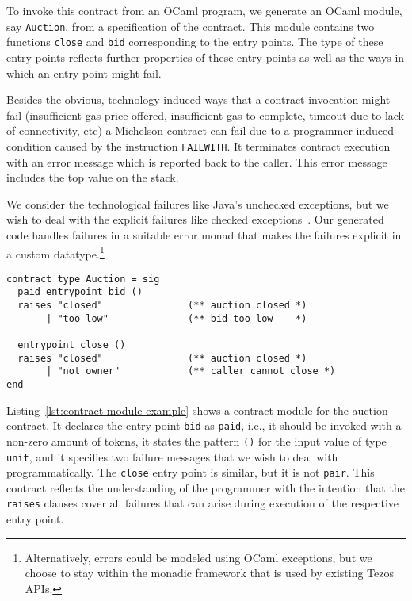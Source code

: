 \documentclass[a4paper,USenglish,american,cleveref, autoref, thm-restate]{oasics-v2021}
\begin{document}
To invoke this contract from an OCaml program, we generate an
OCaml module, say \lstinline/Auction/, from a specification of the
contract. This module contains two functions
\lstinline/close/ and \lstinline/bid/ corresponding to the
entry points. The type of these entry points reflects further properties
of these entry points as well as the ways in which an entry point might
fail.

Besides the obvious, technology induced ways that a contract invocation might fail
(insufficient gas price offered, insufficient gas to complete, timeout
due to lack of connectivity, etc) a Michelson contract can fail due to
a programmer induced condition caused by the
instruction \lstinline/FAILWITH/. It terminates contract execution
with an error message which is reported back to the caller. This error
message includes the top value on the stack.

We consider the technological failures like Java's unchecked
exceptions, but we wish to deal with the explicit failures like
checked exceptions~\cite{DBLP:conf/oopsla/AnconaLZ01}.
Our generated code handles failures in a suitable
error monad that makes the failures explicit in a custom
datatype.\footnote{Alternatively, errors could be modeled using OCaml
  exceptions, but we choose to stay within the monadic framework that
  is used by existing Tezos APIs.}

\begin{lstlisting}[float,captionpos=b,caption={Example contract module},label={lst:contract-module-example}]
contract type Auction = sig
  paid entrypoint bid () 
  raises "closed"               (** auction closed *)
       | "too low"              (** bid too low    *)

  entrypoint close ()
  raises "closed"               (** auction closed *)
       | "not owner"            (** caller cannot close *)
end
\end{lstlisting}
Listing~\ref{lst:contract-module-example} shows a contract module for
the auction contract.  It declares the entry point \lstinline/bid/ as
\lstinline/paid/, i.e., it should be invoked with a
non-zero amount of tokens, it states the pattern \lstinline/()/ for the
input value of type \lstinline/unit/, and it specifies two 
failure messages that we wish to deal with programmatically.
The \lstinline/close/ entry point is similar, but it is not
\lstinline/pair/. This contract reflects the understanding of the
programmer with the intention that the \lstinline/raises/ clauses
cover all failures that can arise during execution of the respective
entry point. 
\end{document}

